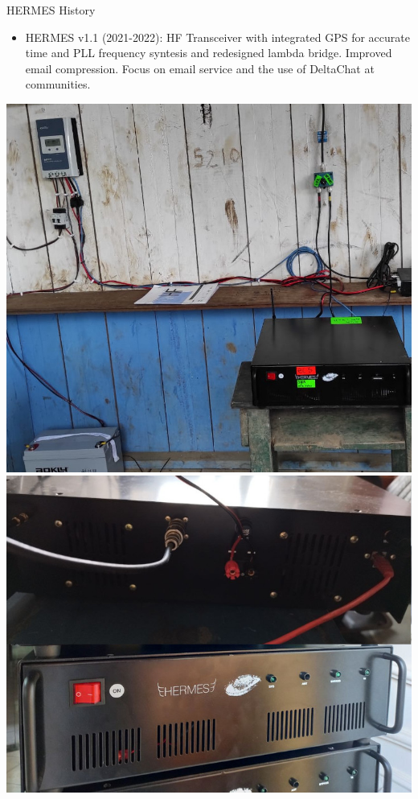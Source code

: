 \documentclass[aspectratio=169,xcolor={x11names,svgnames,dvipsnames}]{beamer}
\begin{document}
\begin{frame}{HERMES History}

  \begin{itemize}
  \item HERMES v1.1 (2021-2022): HF Transceiver with integrated GPS for accurate time and PLL frequency syntesis and redesigned lambda bridge.
   Improved email compression. Focus on email service and the use of DeltaChat at communities.
  \end{itemize}


\begin{center}
  \includegraphics[width=.41\columnwidth]{hermes2.jpg}
  \includegraphics[width=.48\columnwidth]{hermes3.jpg}

\end{center}

\end{frame}
\end{document}
